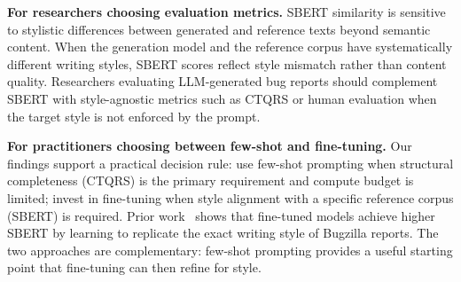 \textbf{For researchers choosing evaluation metrics.}
SBERT similarity is sensitive to stylistic differences
between generated and reference texts beyond semantic
content. When the generation model and the reference corpus
have systematically different writing styles, SBERT scores
reflect style mismatch rather than content quality.
Researchers evaluating LLM-generated bug reports should
complement SBERT with style-agnostic metrics such as CTQRS
or human evaluation when the target style is not enforced
by the prompt.

\textbf{For practitioners choosing between few-shot and fine-tuning.}
Our findings support a practical decision rule: use
few-shot prompting when structural completeness (CTQRS) is
the primary requirement and compute budget is limited;
invest in fine-tuning when style alignment with a specific
reference corpus (SBERT) is required. Prior
work~\cite{acharya2025bugquality, choi2025agentreport,
yang2025ctqrsrl} shows that fine-tuned models achieve
higher SBERT by learning to replicate the exact writing
style of Bugzilla reports. The two approaches are
complementary: few-shot prompting provides a useful
starting point that fine-tuning can then refine for style.
